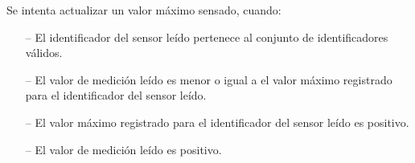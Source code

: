 \begin{tcolorbox}[colback=gray!5!white,colframe=gray!50!black,
  colbacktitle=gray!75!black,title=KeepMaxReading\_SP\_14]
  Se intenta actualizar un valor máximo sensado, cuando:
     \begin{itemize}
        \item[--]{El identificador del sensor leído pertenece al conjunto de identificadores válidos.} 
        \item[--]{El valor de medición leído es menor o igual a el valor máximo registrado para el identificador del sensor leído.}
        \item[--]{El valor máximo registrado para el identificador del sensor leído es positivo.}
        \item[--]{El valor de medición leído es positivo.}
     \end{itemize}
\end{tcolorbox}